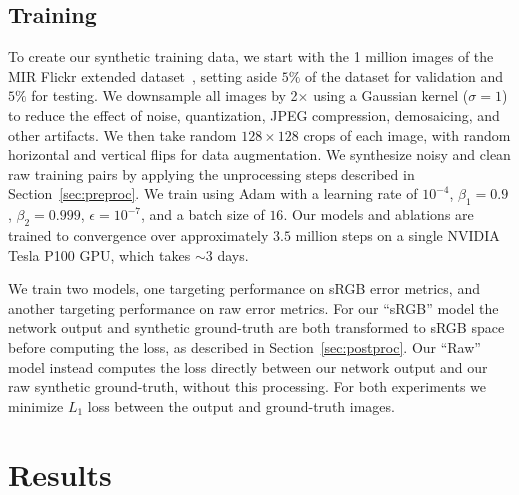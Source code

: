 \documentclass[10pt,twocolumn,letterpaper]{article}
\begin{document}
\subsection{Training}
\label{sec:training}

To create our synthetic training data, we start with the 1 million images of the MIR Flickr extended dataset~\cite{huiskes10mir}, setting aside $5\%$ of the dataset for validation and $5\%$ for testing. We downsample all images by 2$\times$ using a Gaussian kernel ($\sigma=1$) to reduce the effect of noise, quantization, JPEG compression, demosaicing, and other artifacts. We then take random $128 \times 128 $ crops of each image, with random horizontal and vertical flips for data augmentation. We synthesize noisy and clean raw training pairs by applying the unprocessing steps described in Section~\ref{sec:preproc}.
We train using Adam \cite{KingmaB14} with a learning rate of $10^{-4}$, $\beta_1=0.9$, $\beta_2=0.999$, $\epsilon=10^{-7}$, and a batch size of $16$. Our models and ablations are trained to convergence over approximately $3.5$ million steps on a single NVIDIA Tesla P100 GPU, which takes $\sim$3 days.

We train two models, one targeting performance on sRGB error metrics, and another targeting performance on raw error metrics. For our ``sRGB'' model the network output and synthetic ground-truth are both transformed to sRGB space before computing the loss, as described in Section~\ref{sec:postproc}. Our ``Raw'' model instead computes the loss directly between our network output and our raw synthetic ground-truth, without this processing. For both experiments we minimize $L_1$ loss between the output and ground-truth images.





\section{Results}
\label{sec:results}
\end{document}
